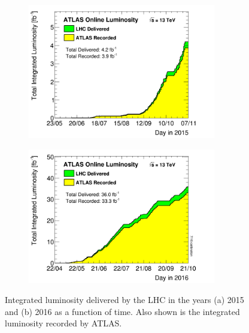 \begin{figure}[t!]
  \begin{subfigure}{0.5\textwidth}
  \centering
  \includegraphics[width=0.9\textwidth]{figures/Detector/Lumi2015.png}
  \captionsetup{width=0.85\textwidth} \caption{\small }
  \label{sec:det:fig:lumi15}
\end{subfigure}
\begin{subfigure}{0.5\textwidth}
  \centering
  \includegraphics[width=0.9\textwidth]{figures/Detector/Lumi2016.png}
  \captionsetup{width=0.85\textwidth} \caption{\small }
  \label{sec:det:fig:lumi16}
\end{subfigure}

\captionsetup{width=0.85\textwidth} \caption{\small Integrated luminosity delivered by the LHC in the years (a) 2015 and (b) 2016 as a function of time. Also shown is the integrated luminosity recorded by ATLAS.}
\label{sec:det:fig:ATLASLumi}
\end{figure}


